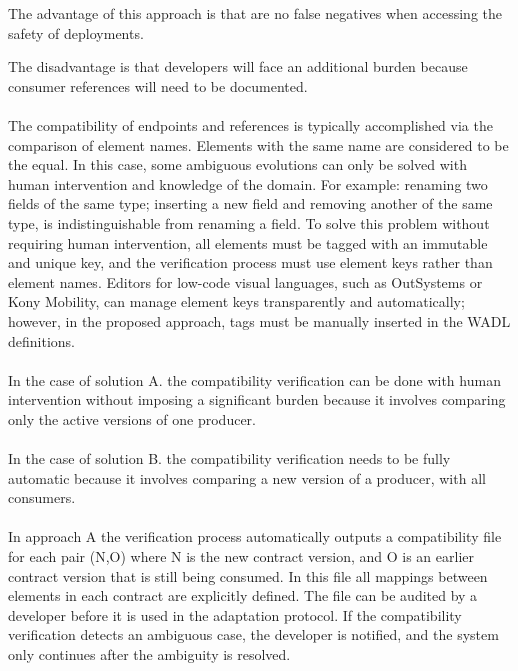 The advantage of this approach is that are no false negatives when accessing the safety of deployments.

The disadvantage is that developers will face an additional burden because consumer references will need to be documented.

\paragraph{}

The compatibility of endpoints and references is typically accomplished via the comparison of element names.
Elements with the same name are considered to be the equal.
In this case, some ambiguous evolutions can only be solved with human intervention and knowledge of the domain.
For example: renaming two fields of the same type; inserting a new field and removing another of the same type, is indistinguishable from renaming a field.
To solve this problem without requiring human intervention,
all elements must be tagged with an immutable and unique key,
and the verification process must use element keys rather than element names.
Editors for low-code visual languages, such as OutSystems or Kony Mobility, can manage element keys transparently and automatically;
however, in the proposed approach, tags must be manually inserted in the WADL definitions.

\paragraph{}
In the case of solution A. the compatibility verification can be done with human intervention without imposing a significant burden
because it involves comparing only the active versions of one producer.

\paragraph{}
In the case of solution B. the compatibility verification needs to be fully automatic because it involves comparing a new version of a producer, with all consumers.

\paragraph{}

In approach A the verification process automatically outputs a compatibility file for each pair (N,O) where N is the new contract version,
and O is an earlier contract version that is still being consumed.
In this file all mappings between elements in each contract are explicitly defined.
The file can be audited by a developer before it is used in the adaptation protocol.
If the compatibility verification detects an ambiguous case, the developer is notified, and the system only continues after the ambiguity is resolved.

